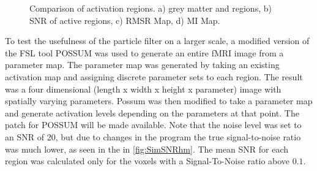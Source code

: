 \begin{figure}

\caption[Comparison of activation regions.]
{Comparison of activation regions. a) grey matter and regions, b) \acs{SNR} of active
regions, c) \acs{RMSR} Map, d) \acs{MI} Map.}
\label{fig:simslice_hm}
\end{figure}

To test the usefulness of the particle filter on a larger scale, a modified version
of the \ac{FSL} tool
\ac{POSSUM} was used to generate an entire \ac{fMRI} image from a parameter map. The parameter map was generated
by taking an existing activation map and assigning discrete parameter sets to each region.
The result was a four dimensional (length x width
x height x parameter) image with spatially varying parameters. Possum was then modified
to take a parameter map and generate activation levels depending on the parameters at that
point. The patch for \ac{POSSUM} will be made available. Note that the noise
level was set to an \ac{SNR} of 20, but due to changes
in the program the true signal-to-noise ratio was much lower, as seen in the
in \autoref{fig:SimSNRhm}. The mean \ac{SNR} for each region was calculated only for the
voxels with a Signal-To-Noise ratio above $0.1$.

